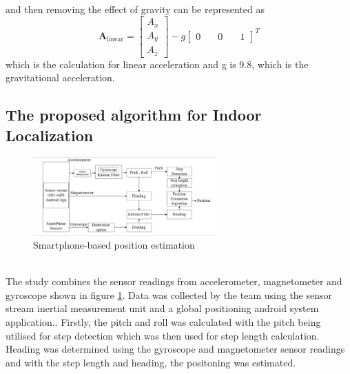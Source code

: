 \documentclass{l4proj}
\begin{document}
\\
and then removing the effect of gravity can be represented as
\begin{equation*} {\boldsymbol {A}_{\textrm {linear}}} = \left [{ {\begin{array}{*{20}{c}} {A_{x}}\\ {A_{y}}\\ {A_{z}} \end{array}} }\right] - g{\left [{ {\begin{array}{*{20}{c}} 0&\quad 0&\quad 1 \end{array}} }\right]^{T}} \tag{6}\end{equation*}which is the calculation for linear acceleration and g is 9.8, which is the gravitational acceleration.
\subsection{The proposed algorithm for Indoor Localization}
\begin{figure}[h]
    \centering
    \includegraphics[width=70mm]{images/estalgo}
    \caption{Smartphone-based position estimation}
    \label{fig:estalgo1}
\end{figure}\\
The study combines the sensor readings from accelerometer, magnetometer and gyroscope shown in figure \ref{fig:estalgo1}. Data was collected by the team using the sensor stream inertial measurement unit and a global positioning android system application.\cite{datacollect}. Firstly, the pitch and roll was calculated with the pitch being utilised for step detection which was then used for step length calculation. Heading was determined using the gyroscope and magnetometer sensor readings and with the step length and heading, the positoning was estimated.
\end{document}
